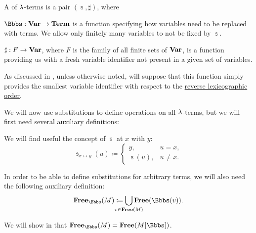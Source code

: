 \begin{definition}\label{def:lambda_term_substitution}\mimprovised
  A  of \( {\mathrm \lambda} \)-terms is a pair \( (\Bbbs, \sharp) \), where
  \begin{thmenum}[series=def:lambda_term_substitution]
     \( \Bbbs: \op*{Var} \to \op*{Term} \) is a function specifying how variables need to be replaced with terms. We allow only finitely many variables to not be fixed by \( \Bbbs \).

     \( \sharp: F \to \op*{Var} \), where \( F \) is the family of all finite sets of \( \op*{Var} \), is a function providing us with a fresh variable identifier not present in a given set of variables.

    As discussed in , unless otherwise noted, will suppose that this function simply provides the smallest variable identifier with respect to the \hyperref[def:lexicographic_order]{reverse lexicographic order}.
  \end{thmenum}

  We will now use substitutions to define operations on all \( {\mathrm \lambda} \)-terms, but we will first need several auxiliary definitions:
  \begin{thmenum}[resume=def:lambda_term_substitution]
     We will find useful the concept of  \( \Bbbs \) at \( x \) with \( y \):
    \begin{equation}\label{eq:def:lambda_term_substitution/modified}
      \Bbbs_{x \mapsto y}(u) \coloneqq \begin{cases}
        y,        &u = x, \\
        \Bbbs(u), &u \neq x.
      \end{cases}
    \end{equation}

     In order to be able to define substitutions for arbitrary terms, we will also need the following auxiliary definition:
    \begin{equation}\label{eq:def:lambda_term_substitution/free}
      \op*{Free}_\Bbbs(M) \coloneqq \bigcup_{\mathclap{v \in \op*{Free}(M)}} \op*{Free}(\Bbbs(v)).
    \end{equation}

    We will show in  that \( \op*{Free}_\Bbbs(M) = \op*{Free}(M[\Bbbs]) \).


\end{thmenum}
\end{definition}
